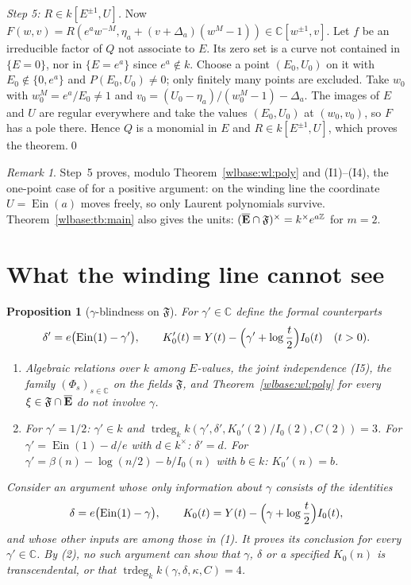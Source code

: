 \documentclass[11pt,a4paper]{article}
\newtheorem{proposition}[theorem]{Proposition}
\theoremstyle{definition}\newtheorem{definition}[theorem]{Definition}
\theoremstyle{remark}\newtheorem{remark}[theorem]{Remark}
\newcommand{\Ein}{\operatorname{Ein}}
\newcommand{\F}{\mathfrak F}\newcommand{\FF}{\mathbb F}
\newcommand{\C}{\mathbb C}\newcommand{\Z}{\mathbb Z}
\DeclareMathOperator{\trdeg}{trdeg}\DeclareMathOperator{\Res}{Res}
\begin{document}
\emph{Step 5: $R\in k[E^{\pm1},U]$.} Now
$F(w,v)=R(e^aw^{-M},\eta_a+(v+\Delta_a)(w^M-1))\in\C[w^{\pm1},v]$. Let $f$ be
an irreducible factor of $Q$ not associate to $E$. Its zero set is a curve not
contained in $\{E=0\}$, nor in $\{E=e^a\}$ since $e^a\notin k$. Choose a point
$(E_0,U_0)$ on it with $E_0\notin\{0,e^a\}$ and $P(E_0,U_0)\ne0$; only finitely
many points are excluded. Take $w_0$ with $w_0^M=e^a/E_0\ne1$ and
$v_0=(U_0-\eta_a)/(w_0^M-1)-\Delta_a$. The images of $E$ and $U$ are regular
everywhere and take the values $(E_0,U_0)$ at $(w_0,v_0)$, so $F$ has a pole
there. Hence $Q$ is a monomial in $E$ and $R\in k[E^{\pm1},U]$, which proves
the theorem.\qed

\begin{remark}
Step~5 proves, modulo Theorem~\ref{wlbase:wl:poly} and (I1)--(I4), the
one-point case of \cite[Theorem~ner:main]{EB} for a positive argument: on the
winding line the coordinate $U=\Ein(a)$ moves freely, so only Laurent
polynomials survive. Theorem~\ref{wlbase:tb:main} also gives the units:
$(\Ebar\cap\F)^\times=k^\times e^{a\Z}$ for $m=2$.
\end{remark}

\section{What the winding line cannot see}

\begin{proposition}[$\gamma$-blindness on $\F$]\label{wlbase:lim:main}
For $\gamma'\in\C$ define the formal counterparts
\[
 \delta'=e\bigl(\Ein(1)-\gamma'\bigr),\qquad
 K_0'(t)=Y(t)-\Bigl(\gamma'+\log\frac t2\Bigr)I_0(t)\quad(t>0).
\]
\begin{enumerate}
\item Algebraic relations over $k$ among $E$-values, the joint independence
(I5), the family $(\Phi_s)_{s\in\C}$ on the fields $\F$, and
Theorem~\ref{wlbase:wl:poly} for every $\xi\in\F\cap\Ebar$ do not involve $\gamma$.
\item For $\gamma'=1/2$: $\gamma'\in k$ and
$\trdeg_kk(\gamma',\delta',K_0'(2)/I_0(2),C(2))=3$. For
$\gamma'=\Ein(1)-d/e$ with $d\in k^\times$: $\delta'=d$. For
$\gamma'=\beta(n)-\log(n/2)-b/I_0(n)$ with $b\in k$: $K_0'(n)=b$.
\end{enumerate}
Consider an argument whose only information about $\gamma$ consists of the
identities
\[
 \delta=e\bigl(\Ein(1)-\gamma\bigr),\qquad
 K_0(t)=Y(t)-\Bigl(\gamma+\log\frac t2\Bigr)I_0(t),
\]
and whose other inputs are among those in \textup{(1)}. It proves its
conclusion for every $\gamma'\in\C$. By \textup{(2)}, no such argument can
show that $\gamma$, $\delta$ or a specified $K_0(n)$ is transcendental, or
that $\trdeg_kk(\gamma,\delta,\kappa,C)=4$.
\end{proposition}
\end{document}
